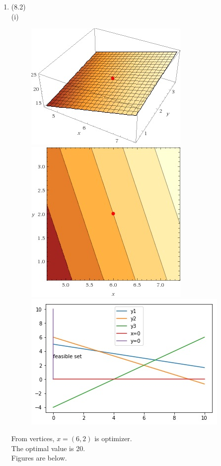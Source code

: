 \documentclass[letterpaper,12pt]{article}
\theoremstyle{definition}
\begin{document}
\begin{enumerate}
	\item (8.2) \\
(i) \\
\begin{figure}[htbp]
\begin{center}
    \includegraphics[scale=0.9]{8p2a}
    \includegraphics[scale=0.5]{8p2b}
    \includegraphics[scale=0.5]{8p2c}
    \caption{} \label{fig:label}
\end{center}
\end{figure}
From vertices, $x = (6, 2)$ is optimizer.\\ The optimal value is 20.\\ Figures are below.\\

\end{enumerate}
\end{document}
